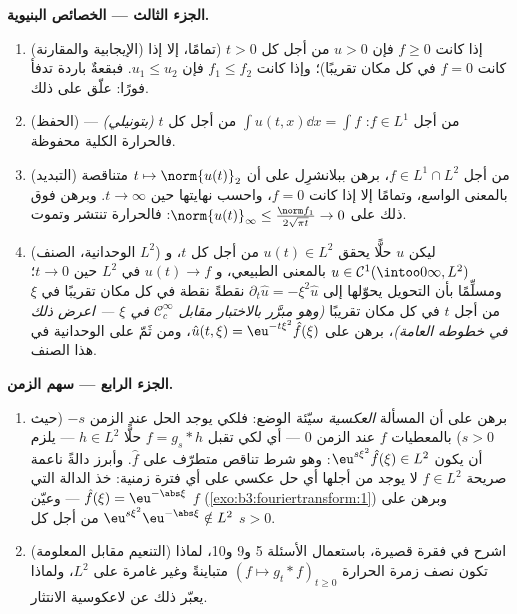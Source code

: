 \begin{problem}[{مسألة نهاية الأسبوع --- $\partial_tu =
\partial^2_{xx}u$، محلولةً من
أولها إلى آخرها}]
\medskip
\noindent\textbf{الجزء الثالث --- الخصائص البنيوية.}
\begin{enumerate}[resume]
  \item (الإيجابية والمقارنة) إذا كانت $f \geq 0$ فإن $u > 0$
        من أجل كل $t > 0$ (تمامًا، إلا إذا كانت $f = 0$ في كل
        مكان تقريبًا)؛ وإذا كانت $f_1 \leq f_2$ فإن
        $u_1 \leq u_2$. فبقعةٌ باردة تدفأ فورًا: علّق على
        ذلك.
  \item (الحفظ) من أجل $f \in L^1$: $\int u(t, x)\dd x =
        \int f$ من أجل كل $t$
        \emph{(بتونيلي)} --- فالحرارة الكلية محفوظة.
  \item (التبديد) من أجل $f \in L^1\cap L^2$، برهن ببلانشرِل على أن
        $t \mapsto \norm{u(t)}_2$ متناقصة بالمعنى الواسع، وتمامًا إلا إذا كانت
        $f = 0$، واحسب نهايتها حين $t \to \infty$. وبرهن فوق
        ذلك على $\norm{u(t)}_\infty \leq \frac{\norm
        f_1}{2\sqrt{\pi t}} \to 0$: فالحرارة تنتشر وتموت.
  \item (الوحدانية، الصنف $L^2$) ليكن $u$ حلًّا يحقق
        $u(t) \in L^2$ من أجل كل $t$، و $u \in \mathcal
        C^1(\intoo0\infty, L^2)$ بالمعنى
        الطبيعي، و $u(t) \to f$ في $L^2$ حين $t\to0$؛
        ومسلِّمًا بأن التحويل يحوّلها إلى $\partial_t\hat u =
        -\xi^2\hat u$ نقطةً نقطة
        في كل مكان تقريبًا في $\xi$ من أجل $t$ في كل مكان
        تقريبًا \emph{(وهو مبرَّر بالاختبار مقابل $\mathcal
        C_c^\infty$ في
        $\xi$ --- اعرض ذلك في خطوطه العامة)}، برهن على
        $\hat u(t,\xi) = \eu^{-t\xi^2}\hat f(\xi)$، ومن ثَمّ على الوحدانية في هذا الصنف.
\end{enumerate}

\medskip
\noindent\textbf{الجزء الرابع --- سهم الزمن.}
\begin{enumerate}[resume]
  \item برهن على أن المسألة \emph{العكسية} سيّئة الوضع: فلكي
        يوجد الحل عند الزمن $-s$ (حيث $s > 0$) بالمعطيات $f$
        عند الزمن $0$ --- أي لكي تقبل $f = g_s * h$ حلًّا
        $h \in L^2$ --- يلزم أن يكون $\eu^{s\xi^2}\hat f(\xi) \in L^2$: وهو شرط تناقص
        متطرّف على $\hat f$. وأبرز دالةً ناعمة صريحة $f
        \in L^2$
        لا يوجد من أجلها أي حل عكسي على أي فترة زمنية: خذ
        الدالة التي $\hat f(\xi) =
        \eu^{-\abs\xi}$ --- وعيّن $f$ (\cref{exo:b3:fouriertransform:1}) وبرهن
        على $\eu^{s\xi^2}\eu^{-\abs\xi} \notin L^2$ من أجل كل $s >
        0$.
  \item (التنعيم مقابل المعلومة) اشرح في فقرة قصيرة،
        باستعمال الأسئلة 5 و9 و10، لماذا تكون نصف زمرة
        الحرارة $(f \mapsto g_t * f)_{t\geq0}$ متباينةً وغير غامرة على $L^2$، ولماذا
        يعبّر ذلك عن لاعكوسية الانتثار.
\end{enumerate}


\end{problem}
